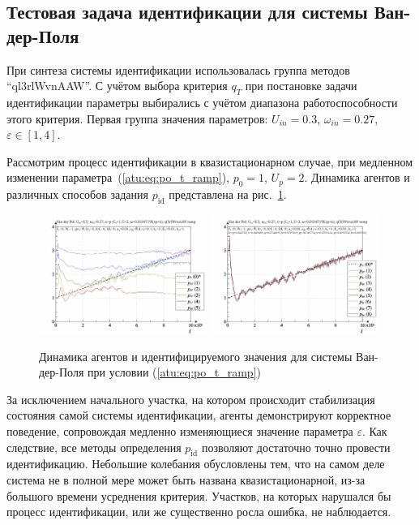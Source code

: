 
\subsection{Тестовая задача идентификации для системы Ван-дер-Поля}  %

При синтеза системы идентификации использовалась группа методов ``ql3rlWvnAAW''.
С учётом выбора критерия $q_{T}$ при постановке задачи идентификации
параметры выбирались с учётом диапазона работоспособности этого критерия.
Первая группа значения параметров: $U_{in}=0.3$, $\omega_{in}=0.27$, $ \varepsilon \in [1, 4 ]$.

Рассмотрим процесс идентификации
в квазистационарном случае,
при медленном изменении параметра~(\ref{atu:eq:po_t_ramp}), $p_0=1$, $U_p=2$.
Динамика агентов и различных способов задания $p_\mathrm{id}$
представлена на рис.~\ref{atu:f:vdp_id1_ramp}.

\begin{figure}[ht!]
\begin{center}
  \includegraphics[width=0.49\textwidth]{p/cha/vdp/vdp_id-p_t_pi_ql3rlWvnAAW_ramp.png}
  \hfill
  \includegraphics[width=0.49\textwidth]{p/cha/vdp/vdp_id-p_t_p_ql3rlWvnAAW_ramp.png}
\end{center}
  \caption{Динамика агентов и идентифицируемого значения для системы Ван-дер-Поля при условии (\ref{atu:eq:po_t_ramp})}
\label{atu:f:vdp_id1_ramp}
\end{figure}

За исключением начального участка, на котором происходит стабилизация
состояния самой системы идентификации, агенты демонстрируют корректное поведение,
сопровождая медленно изменяющиеся значение параметра $\varepsilon$.
Как следствие, все методы определения $p_\mathrm{id}$
позволяют достаточно точно провести идентификацию.
Небольшие колебания обусловлены тем, что на самом деле
система не в полной мере может быть названа квазистационарной,
из-за большого времени усреднения критерия.
Участков, на которых нарушался бы процесс идентификации,
или же существенно росла ошибка, не наблюдается.

